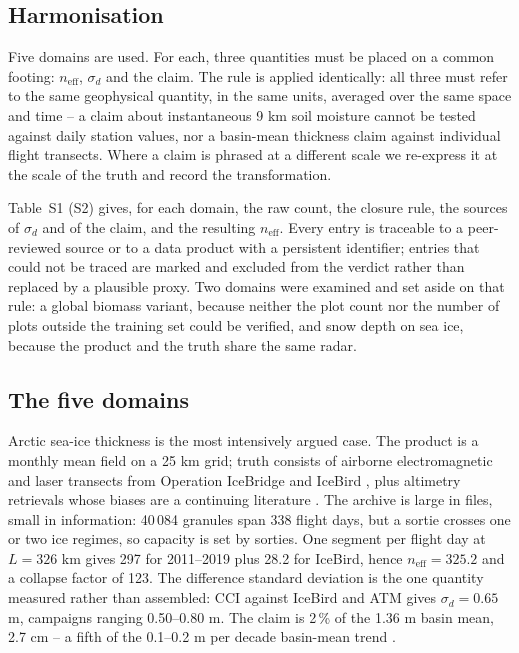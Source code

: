 \documentclass[preprint,12pt,authoryear]{elsarticle}
\begin{document}
\subsection{Harmonisation}

Five domains are used. For each, three quantities must be placed on a common footing: $n_{\mathrm{eff}}$, $\sigma_d$ and the claim. The rule is applied identically: all three must refer to the same geophysical quantity, in the same units, averaged over the same space and time -- a claim about instantaneous 9 km soil moisture cannot be tested against daily station values, nor a basin-mean thickness claim against individual flight transects. Where a claim is phrased at a different scale we re-express it at the scale of the truth and record the transformation.

Table~S1 (S2) gives, for each domain, the raw count, the closure rule, the sources of $\sigma_d$ and of the claim, and the resulting $n_{\mathrm{eff}}$. Every entry is traceable to a peer-reviewed source or to a data product with a persistent identifier; entries that could not be traced are marked and excluded from the verdict rather than replaced by a plausible proxy. Two domains were examined and set aside on that rule: a global biomass variant, because neither the plot count nor the number of plots outside the training set could be verified, and snow depth on sea ice, because the product and the truth share the same radar.

\subsection{The five domains}

Arctic sea-ice thickness is the most intensively argued case. The product is a monthly mean field on a 25 km grid; truth consists of airborne electromagnetic and laser transects from Operation IceBridge \citep{kurtz2013sea,kurtz2011snow} and IceBird \citep{icebird_pangaea}, plus altimetry retrievals whose biases are a continuing literature \citep{laxon2013cryosat,ricker2014first,ricker2017weekly,sallila2019assessment,landy2022year}. The archive is large in files, small in information: 40\,084 granules span 338 flight days, but a sortie crosses one or two ice regimes, so capacity is set by sorties. One segment per flight day at $L = 326$ km gives 297 for 2011--2019 plus 28.2 for IceBird, hence $n_{\mathrm{eff}} = 325.2$ and a collapse factor of 123. The difference standard deviation is the one quantity measured rather than assembled: CCI against IceBird and ATM gives $\sigma_d = 0.65$ m, campaigns ranging 0.50--0.80 m. The claim is 2\,\% of the 1.36 m basin mean, 2.7 cm -- a fifth of the 0.1--0.2 m per decade basin-mean trend \citep{kwok2009thinning,laxon2013cryosat,stroeve2018arctic}.
\end{document}
